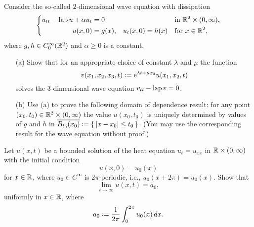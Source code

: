 \begin{problem}
  Consider the so-called \(2\)-dimensional wave equation with dissipation
  \[
    \left\{
      \begin{aligned}
        u_{tt}-\operatorname{lap} u+\alpha u_t&=0&&&&\text{in \(\mathbb{R}^2\times(0,\infty)\),}\\
        u(x,0)&=g(x),&u_t(x,0)&=h(x)&&\text{for \(x\in\mathbb{R}^2\),}
      \end{aligned}
    \right.
  \]
  where \(g,h\in C_0^\infty(\mathbb{R}^2)\) and \(\alpha\geq 0\) is a constant.
  \begin{itemize}[noitemsep]
  \item[(a)] Show that for an appropriate choice of constant \(\lambda\)
    and \(\mu\) the function
    \[
      v(x_1,x_2,x_3,t)\defeq \rme^{\lambda t+\mu x_3}u(x_1,x_2,t)
    \]
    solves the \(3\)-dimensional wave equation \(v_{tt}-\operatorname{lap} v=0\).
  \item[(b)] Use (a) to prove the following domain of dependence result:
    for any point \((x_0,t_0)\in\mathbb{R}^2\times(0,\infty)\) the value
    \(u(x_0,t_0)\) is uniquely determined by values of \(g\) and \(h\) in
    \(\overline{B_{t_0}(x_0)}\defeq\{\,|x-x_0|\leq t_0\,\}\). (You may use
    the corresponding result for the wave equation without proof.)
  \end{itemize}
\end{problem}
\begin{solution*}
\end{solution*}

\begin{problem}
  Let \(u(x,t)\) be a bounded solution of the heat equation \(u_t=u_{xx}\)
  in \(\mathbb{R}\times(0,\infty)\) with the initial condition
  \[
    u(x,0)=u_0(x)
  \]
  for \(x\in\mathbb{R}\), where \(u_0\in C^\infty\) is \(2\pi\)-periodic, i.e.,
  \(u_0(x+2\pi)=u_0(x)\). Show that
  \[
    \lim_{t\to\infty} u(x,t)=a_0,
  \]
  uniformly in \(x\in\mathbb{R}\), where
  \[
    a_0\defeq\frac{1}{2\pi}\int_0^{2\pi} u_0(x)\diff x.
  \]
\end{problem}
\begin{solution*}
\end{solution*}

